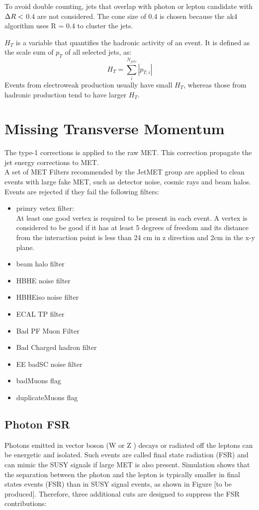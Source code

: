 \documentclass[thesis.tex]{subfiles}
\renewcommand\_{\textunderscore\allowbreak}
\begin{document}
To avoid double counting, jets that overlap with photon or lepton candidate with $\Delta R <$ 0.4 are not considered.
The cone size of 0.4 is chosen because the ak4 algorithm uses R = 0.4 to cluster the jets.  

$H_T$ is a variable that quantifies the hadronic activity of an event. 
It is defined as the scale sum of $p_T$ of all selected jets, as:
	\begin{equation*}
		 H_T = \sum_i^{N_{jets}}|p_{T,i}|
	\end{equation*}
Events from electroweak production usually have small $H_T$, whereas those from hadronic production tend to have larger $H_T$. 


\section{Missing Transverse Momentum}
 The type-1 corrections is applied to the raw MET. This correction propagate the jet energy corrections to MET.  \\

A set of MET Filters recommended by the JetMET group are applied to clean events with large fake MET, such as detector noise, cosmic rays and beam halos. Events are rejected if they fail the following filters:

\begin{center}
\begin{itemize}
\item primry vetex filter:\\
		At least one good vertex is required to be present in each event. A vertex is considered to be good if it has at least 5 degrees of freedom and its distance from the interaction point is less than 24 cm in z direction and 2cm in the x-y plane. 
\item beam halo filter
\item HBHE noise filter
\item HBHEiso noise filter
\item ECAL TP filter
\item Bad PF Muon Filter
\item Bad Charged hadron filter
\item EE badSC noise filter
\item badMuons flag
\item duplicateMuons flag
\end{itemize}
\end{center}

\subsection{Photon FSR}
  Photons emitted in vector boson (W or Z ) decays or radiated off the leptons can be energetic and isolated. Such events are called final state radiation (FSR) and can mimic the SUSY signals if large MET is also present. Simulation shows that the separation between the photon and the lepton is typically smaller in final states events (FSR) than in SUSY signal events, as shown in Figure [to be produced]. Therefore, three additional cuts are designed to suppress the FSR contributions:
\end{document}
